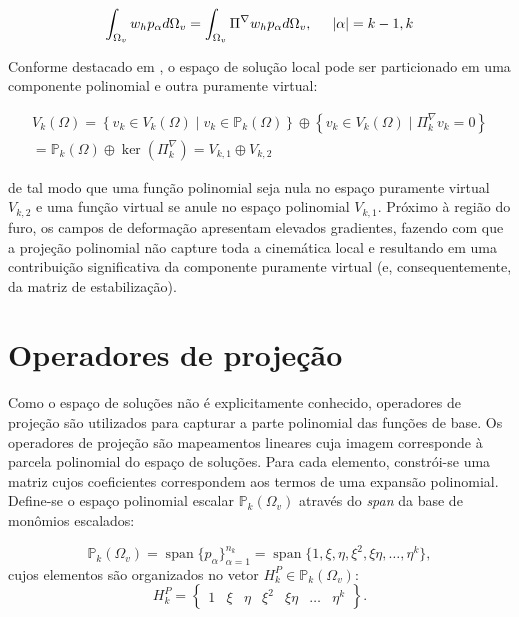     \begin{equation}
        \int_{\Omega_v} w_h p_\alpha d\Omega_v = \int_{\Omega_v} \Pi^\nabla w_h p_\alpha d\Omega_v, \hspace{5mm} \vert{}\alpha\vert{} = k-1,k 
        \label{eq:4.11}
    \end{equation}

    \indent Conforme destacado em \citet{illconditioningvirtualelementmethodstabilizationsbases2018}, o espaço de solução local pode ser particionado em uma componente polinomial e outra puramente virtual:

    \begin{equation}
        \begin{aligned}
            V_k (\Omega) = \left\{ v_k \in V_k(\Omega) \mid v_k \in \mathbb{P}_k(\Omega) \right\} \oplus \left\{ v_k \in V_k(\Omega) \mid \Pi_k^\nabla v_k = 0 \right\}\\ = \mathbb{P}_k(\Omega) \oplus \ker(\Pi^\nabla_k) = V_{k,1} \oplus V_{k,2}
        \end{aligned}
    \end{equation}

    \noindent de tal modo que uma função polinomial seja nula no espaço puramente virtual $V_{k,2}$ e uma função virtual se anule no espaço polinomial $V_{k,1}$. Próximo à região do furo, os campos de deformação apresentam elevados gradientes, fazendo com que a projeção polinomial não capture toda a cinemática local e resultando em uma contribuição significativa da componente puramente virtual (e, consequentemente, da matriz de estabilização).

\section{Operadores de projeção}
\label{sec:operadores-de-projecao}

    \indent Como o espaço de soluções não é explicitamente conhecido, operadores de projeção são utilizados para capturar a parte polinomial das funções de base. Os operadores de projeção são mapeamentos lineares cuja imagem corresponde à parcela polinomial do espaço de soluções. Para cada elemento, constrói-se uma matriz cujos coeficientes correspondem aos termos de uma expansão polinomial. Define-se o espaço polinomial escalar $\mathbb{P}_k(\Omega_v)$ através do \textit{span} da base de monômios escalados:
    
    \begin{equation}
        \mathbb{P}_k(\Omega_v) = \operatorname{span} \{ p_\alpha \}_{\alpha=1}^{n_k} = \operatorname{span} \{ 1, \xi, \eta, \xi^2, \xi \eta, \dots, \eta^k \},
        \label{eq:4.12}
    \end{equation}
    cujos elementos são organizados no vetor $H_k^{P} \in \mathbb{P}_k(\Omega_v)$:
    \begin{equation}
        H_k^{P} = \begin{Bmatrix} 1 & \xi & \eta & \xi^2 & \xi \eta & \ldots & \eta^k \end{Bmatrix}.
        \label{eq:4.13}
    \end{equation}

